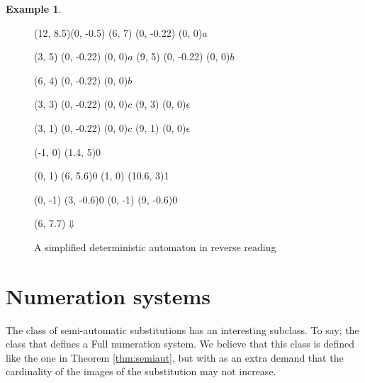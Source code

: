 \documentclass{article}
\theoremstyle{definition}
\newtheorem{example}[theorem]{Example}
\begin{document}
\begin{example}
\begin{itemize}
\begin{figure}[t]
\begin{graph}(12, 8.5)(0, -0.5)
  (6, 7)
    (0, -0.22){} (0, 0){$a$}

  (3, 5)
    (0, -0.22){} (0, 0){$a$}
  (9, 5)
    (0, -0.22){} (0, 0){$b$}

  (6, 4)
    (0, -0.22){} (0, 0){$b$}

  (3, 3)
    (0, -0.22){} (0, 0){$c$}
  (9, 3) (0, 0){$\epsilon$}

  (3, 1)
    (0, -0.22){} (0, 0){$c$}
  (9, 1) (0, 0){$\epsilon$}

   
   

  (-1, 0) \freetext(1.4, 5){0}
   
   
   

   
   
  (0, 1) \freetext(6, 5.6){0}
   
   
  (1, 0) \freetext(10.6, 3){1}

  
  (0, -1) \freetext(3, -0.6){0}
   
  (0, -1) \freetext(9, -0.6){0}
   

  \freetext(6, 7.7){$\Downarrow$}
\end{graph}
\caption{A simplified deterministic automaton in reverse reading}
\label{fig:simpl_det_reverse}
\end{figure}
\end{itemize}
\end{example}

\section{Numeration systems}
The class of semi-automatic substitutions has an interesting subclass. To say;
the class that defines a Full numeration system. We believe that this class
is defined like the one in Theorem \ref{thm:semiaut}, but with as an extra
demand that the cardinality of the images of the substitution may not increase.
\end{document}
